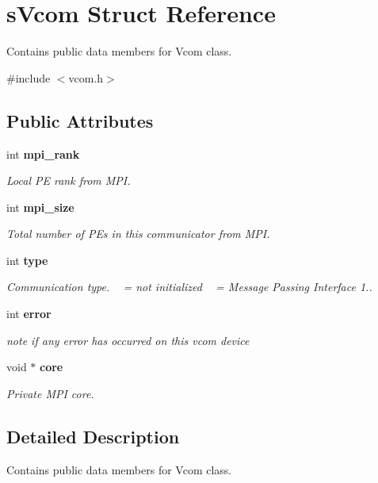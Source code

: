 \section{s\+Vcom Struct Reference}
\label{a00001}


Contains public data members for Vcom class.  




{\ttfamily \#include $<$vcom.\+h$>$}

\subsection*{Public Attributes}
\begin{DoxyCompactItemize}
\item 
int {\bf mpi\+\_\+rank}
\begin{DoxyCompactList}\small\item\em Local P\+E rank from M\+P\+I. \end{DoxyCompactList}\item 
int {\bf mpi\+\_\+size}
\begin{DoxyCompactList}\small\item\em Total number of P\+Es in this communicator from M\+P\+I. \end{DoxyCompactList}\item 
int {\bf type}
\begin{DoxyCompactList}\small\item\em Communication type. ~ = not initialized ~ = Message Passing Interface 1.. \end{DoxyCompactList}\item 
int {\bf error}
\begin{DoxyCompactList}\small\item\em note if any error has occurred on this vcom device \end{DoxyCompactList}\item 
void $\ast$ {\bf core}
\begin{DoxyCompactList}\small\item\em Private M\+P\+I core. \end{DoxyCompactList}\end{DoxyCompactItemize}


\subsection{Detailed Description}
Contains public data members for Vcom class. 


